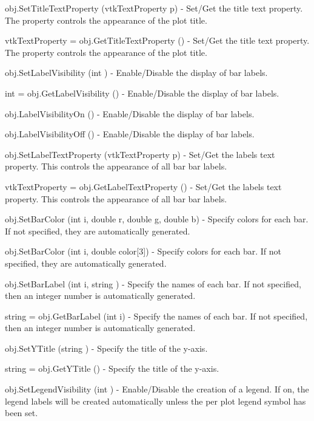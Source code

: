 \begin{DoxyItemize}
\item {\ttfamily obj.\-Set\-Title\-Text\-Property (vtk\-Text\-Property p)} -\/ Set/\-Get the title text property. The property controls the appearance of the plot title.  
\item {\ttfamily vtk\-Text\-Property = obj.\-Get\-Title\-Text\-Property ()} -\/ Set/\-Get the title text property. The property controls the appearance of the plot title.  
\item {\ttfamily obj.\-Set\-Label\-Visibility (int )} -\/ Enable/\-Disable the display of bar labels.  
\item {\ttfamily int = obj.\-Get\-Label\-Visibility ()} -\/ Enable/\-Disable the display of bar labels.  
\item {\ttfamily obj.\-Label\-Visibility\-On ()} -\/ Enable/\-Disable the display of bar labels.  
\item {\ttfamily obj.\-Label\-Visibility\-Off ()} -\/ Enable/\-Disable the display of bar labels.  
\item {\ttfamily obj.\-Set\-Label\-Text\-Property (vtk\-Text\-Property p)} -\/ Set/\-Get the labels text property. This controls the appearance of all bar bar labels.  
\item {\ttfamily vtk\-Text\-Property = obj.\-Get\-Label\-Text\-Property ()} -\/ Set/\-Get the labels text property. This controls the appearance of all bar bar labels.  
\item {\ttfamily obj.\-Set\-Bar\-Color (int i, double r, double g, double b)} -\/ Specify colors for each bar. If not specified, they are automatically generated.  
\item {\ttfamily obj.\-Set\-Bar\-Color (int i, double color\mbox{[}3\mbox{]})} -\/ Specify colors for each bar. If not specified, they are automatically generated.  
\item {\ttfamily obj.\-Set\-Bar\-Label (int i, string )} -\/ Specify the names of each bar. If not specified, then an integer number is automatically generated.  
\item {\ttfamily string = obj.\-Get\-Bar\-Label (int i)} -\/ Specify the names of each bar. If not specified, then an integer number is automatically generated.  
\item {\ttfamily obj.\-Set\-Y\-Title (string )} -\/ Specify the title of the y-\/axis.  
\item {\ttfamily string = obj.\-Get\-Y\-Title ()} -\/ Specify the title of the y-\/axis.  
\item {\ttfamily obj.\-Set\-Legend\-Visibility (int )} -\/ Enable/\-Disable the creation of a legend. If on, the legend labels will be created automatically unless the per plot legend symbol has been set.  

\end{DoxyItemize}
